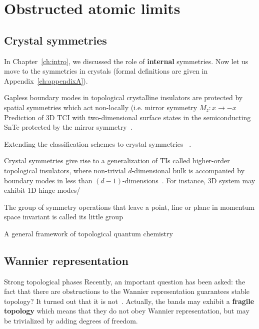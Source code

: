 \chapter{Obstructed atomic limits}
\label{ch:oals}

\section{Crystal symmetries}
In Chapter~\ref{ch:intro}, we discussed the role of \textbf{internal} symmetries. Now let us move to the symmetries in crystals (formal definitions are given in Appendix~\ref{ch:appendixA}).










Gapless boundary modes in topological crystalline insulators are protected by spatial symmetries which act non-locally (i.e. mirror symmetry $M_z: x \rightarrow -x$
Prediction of 3D TCI with two-dimensional surface states in the semiconducting SnTe protected by the mirror symmetry~\cite{FuTCI2011, HsiehTCI2012}.

Extending the classification schemes to crystal symmetries ~\cite{Slager2013, PhysRevB.90.165114, PhysRevB.93.195413, PhysRevB.95.235425, PhysRevB.93.045429}.

Crystal symmetries give rise to a generalization of TIs called higher-order topological insulators, where non-trivial $d$-dimensional bulk is accompanied by boundary modes in less than $(d-1)$-dimensions~\cite{Benalcazar61, PhysRevLett.119.246401, HOTI12018}. For instance, 3D system may exhibit 1D hinge modes/

The group of symmetry operations that leave a point, line or plane in momentum space invariant is called its little group


A general framework of topological quantum chemistry~\cite{TQC2017}

\section{Wannier representation}

Strong topological phases 
Recently, an important question has been asked: the fact that there are obstructions to the Wannier representation guarantees stable topology? It turned out that it is not~\cite{PhysRevLett.121.126402}. Actually, the bands may exhibit a \textbf{fragile topology} which means that they do not obey Wannier representation, but may be trivialized by adding degrees of freedom.


